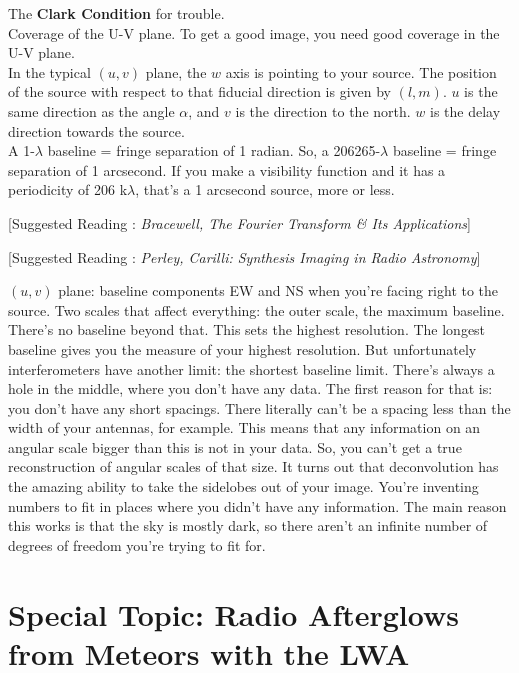 \documentclass[a4paper]{article}
\newcommand{\Comment}[2]{ [{\color{red}\sc #1 :} {{\color{cyan} \it #2}}]}
\begin{document}
The \textbf{Clark Condition} for trouble. \\

Coverage of the U-V plane. To get a good image, you need good coverage in the U-V plane. \\

In the typical $(u,v)$ plane, the $w$ axis is pointing to your source. The position of the source with respect to that fiducial direction is given by $(l,m)$. $u$ is the same direction as the angle $\alpha$, and $v$ is the direction to the north. $w$ is the delay direction towards the source. \\

A 1-$\lambda$ baseline = fringe separation of 1 radian. So, a 206265-$\lambda$ baseline = fringe separation of 1 arcsecond. If you make a visibility function and it has a periodicity of 206 k$\lambda$, that's a 1 arcsecond source, more or less. 

\Comment{Suggested Reading}{Bracewell, The Fourier Transform \& Its Applications}

\Comment{Suggested Reading}{Perley, Carilli: Synthesis Imaging in Radio Astronomy}

$(u,v)$ plane: baseline components EW and NS when you're facing right to the source. Two scales that affect everything: the outer scale, the maximum baseline. There's no baseline beyond that. This sets the highest resolution. The longest baseline gives you the measure of your highest resolution. But unfortunately interferometers have another limit: the shortest baseline limit. There's always a hole in the middle, where you don't have any data. The first reason for that is: you don't have any short spacings. There literally can't be a spacing less than the width of your antennas, for example. This means that any information on an angular scale bigger than this is not in your data. So, you can't get a true reconstruction of angular scales of that size. It turns out that deconvolution has the amazing ability to take the sidelobes out of your image. You're inventing numbers to fit in places where you didn't have any information. The main reason this works is that the sky is mostly dark, so there aren't an infinite number of degrees of freedom you're trying to fit for. 

\section{Special Topic: Radio Afterglows from Meteors with the LWA}
\end{document}
